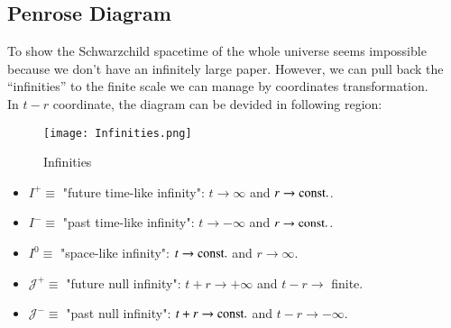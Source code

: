 \documentclass[openany,10pt]{book}
\theoremstyle{definition}
\theoremstyle{definition}
\theoremstyle{remark}
\begin{document}
\subsection{Penrose Diagram}
To show the Schwarzchild spacetime of the whole universe seems impossible because we don't have an infinitely large paper. However, we can pull back the ``infinities'' to the finite scale we can manage by coordinates transformation.\\
In $t-r$ coordinate, the diagram can be devided in following region:
\begin{figure}[H]
    \centering
    \texttt{[image: Infinities.png]}
    \caption{Infinities}
    \label{fig:my_label}
\end{figure}
\begin{itemize}
    \item {$I^+\equiv$ "future time-like infinity": $t\to\infty$ and $r\to{\rm{const.}}$.}
    \item{$I^-\equiv$ "past time-like infinity": $t\to-\infty$ and $r\to{\rm{const.}}$.}
    \item{$I^0\equiv$ "space-like infinity": $t\to{\rm{const.}}$ and $r\to\infty$.}
    \item{$\mathcal{J^+}\equiv$ "future null infinity": $t+r\to+\infty$ and $t-r\to$ finite.}
    \item{$\mathcal{J^-\equiv}$ "past null infinity": $t+r\to{\rm{const.}}$ and $t-r\to-\infty$.}
\end{itemize}
\end{document}
